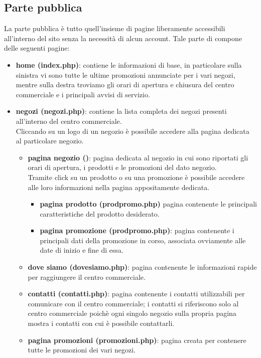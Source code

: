 \documentclass[a4paper,12pt]{article}
\begin{document}
\subsection{Parte pubblica}
La parte pubblica è tutto quell'insieme di pagine liberamente accessibili all'interno del sito senza la necessità di alcun account. Tale parte di compone delle seguenti pagine:
\begin{itemize}
	\item \textbf{home (index.php)}: contiene le informazioni di base, in particolare sulla sinistra vi sono tutte le ultime promozioni annunciate per i vari negozi, mentre sulla destra troviamo gli orari di apertura e chiusura del centro commerciale e i principali avvisi di servizio.\\
	
	\item \textbf{negozi (negozi.php)}: contiene la lista completa dei negozi presenti all'interno del centro commerciale.\\
	Cliccando su un logo di un negozio è possibile accedere alla pagina dedicata al particolare negozio.
	\begin{itemize}
		\item \textbf{pagina negozio ()}: pagina dedicata al negozio in cui sono riportati gli orari di apertura, i prodotti e le promozioni del dato negozio.\\
		Tramite click su un prodotto o su una promozione è possibile accedere alle loro informazioni nella pagina appositamente dedicata.
		\begin{itemize}
		\item \textbf{pagina prodotto (prodpromo.php)} pagina contenente le principali caratteristiche del prodotto desiderato.\\
		\item \textbf{pagina promozione (prodpromo.php)}: pagina contenente i principali dati della promozione in corso, associata ovviamente alle date di inizio e fine di essa.
	\end{itemize}
	\item \textbf{dove siamo (dovesiamo.php)}: pagina contenente le informazioni rapide per raggiungere il centro commerciale.
	\item \textbf{contatti (contatti.php)}: pagina contenente i contatti utilizzabili per comunicare con il centro commerciale; i contatti si riferiscono solo al centro commerciale poichè ogni singolo negozio sulla propria pagina mostra i contatti con cui è possibile contattarli.
	\item \textbf{pagina promozioni (promozioni.php)}: pagina creata per contenere tutte le promozioni dei vari negozi.
	\end{itemize}
\end{itemize}
\end{document}

